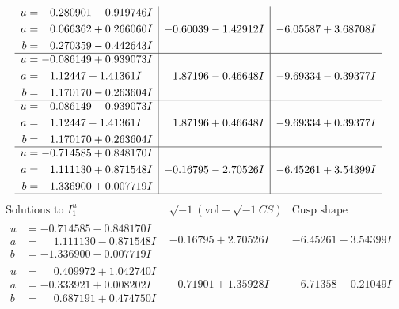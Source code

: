 \documentclass[1p]{elsarticle_modified}
\theoremstyle{definition}
\newcommand{\I}{\sqrt{-1}}
\begin{document}
$$\begin{array}{c|c|c}
\begin{aligned}
u &= \phantom{-}0.280901 - 0.919746 I \\
a &= \phantom{-}0.066362 + 0.266060 I \\
b &= \phantom{-}0.270359 - 0.442643 I\end{aligned}
 & -0.60039 - 1.42912 I & -6.05587 + 3.68708 I \\ \hline\begin{aligned}
u &= -0.086149 + 0.939073 I \\
a &= \phantom{-}1.12447 + 1.41361 I \\
b &= \phantom{-}1.170170 - 0.263604 I\end{aligned}
 & \phantom{-}1.87196 - 0.46648 I & -9.69334 - 0.39377 I \\ \hline\begin{aligned}
u &= -0.086149 - 0.939073 I \\
a &= \phantom{-}1.12447 - 1.41361 I \\
b &= \phantom{-}1.170170 + 0.263604 I\end{aligned}
 & \phantom{-}1.87196 + 0.46648 I & -9.69334 + 0.39377 I \\ \hline\begin{aligned}
u &= -0.714585 + 0.848170 I \\
a &= \phantom{-}1.111130 + 0.871548 I \\
b &= -1.336900 + 0.007719 I\end{aligned}
 & -0.16795 - 2.70526 I & -6.45261 + 3.54399 I\\
 \hline 
 \end{array}$$\newpage$$\begin{array}{c|c|c}  
\text{Solutions to }I^u_{1}& \I (\text{vol} + \sqrt{-1}CS) & \text{Cusp shape}\\
 \hline 
\begin{aligned}
u &= -0.714585 - 0.848170 I \\
a &= \phantom{-}1.111130 - 0.871548 I \\
b &= -1.336900 - 0.007719 I\end{aligned}
 & -0.16795 + 2.70526 I & -6.45261 - 3.54399 I \\ \hline\begin{aligned}
u &= \phantom{-}0.409972 + 1.042740 I \\
a &= -0.333921 + 0.008202 I \\
b &= \phantom{-}0.687191 + 0.474750 I\end{aligned}
 & -0.71901 + 1.35928 I & -6.71358 - 0.21049 I \\ \hline\begin{aligned}

\end{aligned}
\end{array}$$
\end{document}
